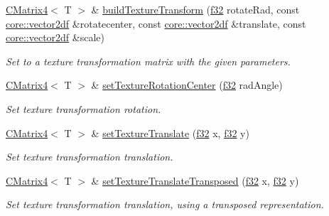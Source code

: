 \begin{DoxyCompactItemize}
\mbox{\label{classirr_1_1core_1_1CMatrix4_a510ddc85fcfcef5f5195de9bae8d312c}} 
\hyperlink{classirr_1_1core_1_1CMatrix4}{C\+Matrix4}$<$ T $>$ \& \hyperlink{classirr_1_1core_1_1CMatrix4_a510ddc85fcfcef5f5195de9bae8d312c}{build\+Texture\+Transform} (\hyperlink{namespaceirr_a0277be98d67dc26ff93b1a6a1d086b07}{f32} rotate\+Rad, const \hyperlink{namespaceirr_1_1core_a116f90bd31515724b6235014ee2b74d5}{core\+::vector2df} \&rotatecenter, const \hyperlink{namespaceirr_1_1core_a116f90bd31515724b6235014ee2b74d5}{core\+::vector2df} \&translate, const \hyperlink{namespaceirr_1_1core_a116f90bd31515724b6235014ee2b74d5}{core\+::vector2df} \&scale)
\begin{DoxyCompactList}\small\item\em Set to a texture transformation matrix with the given parameters. \end{DoxyCompactList}\item 
\hyperlink{classirr_1_1core_1_1CMatrix4}{C\+Matrix4}$<$ T $>$ \& \hyperlink{classirr_1_1core_1_1CMatrix4_abd4be8e5517bae85d64647ee5ddf2c42}{set\+Texture\+Rotation\+Center} (\hyperlink{namespaceirr_a0277be98d67dc26ff93b1a6a1d086b07}{f32} rad\+Angle)
\begin{DoxyCompactList}\small\item\em Set texture transformation rotation. \end{DoxyCompactList}\item 
\hyperlink{classirr_1_1core_1_1CMatrix4}{C\+Matrix4}$<$ T $>$ \& \hyperlink{classirr_1_1core_1_1CMatrix4_a8ebaecaf081c12b2a9e0cf22c86eb498}{set\+Texture\+Translate} (\hyperlink{namespaceirr_a0277be98d67dc26ff93b1a6a1d086b07}{f32} x, \hyperlink{namespaceirr_a0277be98d67dc26ff93b1a6a1d086b07}{f32} y)
\begin{DoxyCompactList}\small\item\em Set texture transformation translation. \end{DoxyCompactList}\item 
\hyperlink{classirr_1_1core_1_1CMatrix4}{C\+Matrix4}$<$ T $>$ \& \hyperlink{classirr_1_1core_1_1CMatrix4_a3c37720b52df398bf0bbe50ff56870eb}{set\+Texture\+Translate\+Transposed} (\hyperlink{namespaceirr_a0277be98d67dc26ff93b1a6a1d086b07}{f32} x, \hyperlink{namespaceirr_a0277be98d67dc26ff93b1a6a1d086b07}{f32} y)
\begin{DoxyCompactList}\small\item\em Set texture transformation translation, using a transposed representation. \end{DoxyCompactList}\item 

\end{DoxyCompactItemize}
